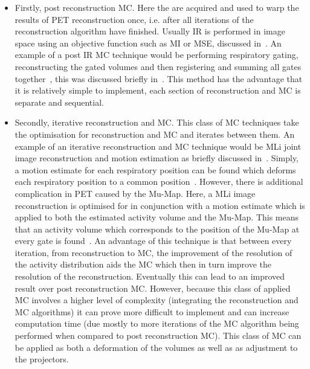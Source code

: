             \begin{itemize}
                \item Firstly, post reconstruction \gls{MC}. Here the  are acquired and used to warp the results of \gls{PET} reconstruction once, i.e. after all iterations of the reconstruction algorithm have finished. Usually \gls{IR} is performed in image space using an objective function such as \gls{MI} or \gls{MSE}, discussed in~. An example of a post \gls{IR} \gls{MC} technique would be performing respiratory gating, reconstructing the gated volumes and then registering and summing all gates together~\parencite{Polycarpou2012AnalysisImaging}, this was discussed briefly in~. This method has the advantage that it is relatively simple to implement, each section of reconstruction and \gls{MC} is separate and sequential.
                
                \item Secondly, iterative reconstruction and \gls{MC}. This class of \gls{MC} techniques take the optimisation for reconstruction and \gls{MC} and iterates between them. An example of an iterative reconstruction and \gls{MC} technique would be \gls{MLi} joint image reconstruction and motion estimation as briefly discussed in~. Simply, a motion estimate for each respiratory position can be found which deforms each respiratory position to a common position~\parencite{Manjeshwar2006, Qiao2006}. However, there is additional complication in \gls{PET} caused by the \gls{Mu-Map}. Here, a \gls{MLi} image reconstruction is optimised for in conjunction with a motion estimate which is applied to both the estimated activity volume and the \gls{Mu-Map}. This means that an activity volume which corresponds to the position of the \gls{Mu-Map} at every gate is found~\parencite{Bousse2016a, Bousse2016}. An advantage of this technique is that between every iteration, from reconstruction to \gls{MC}, the improvement of the resolution of the activity distribution aids the \gls{MC} which then in turn improve the resolution of the reconstruction. Eventually this can lead to an improved result over post reconstruction \gls{MC}. However, because this class of applied \gls{MC} involves a higher level of complexity (integrating the reconstruction and \gls{MC} algorithms) it can prove more difficult to implement and can increase computation time (due mostly to more iterations of the \gls{MC} algorithm being performed when compared to post reconstruction \gls{MC}). This class of \gls{MC} can be applied as both a deformation of the volumes as well as as adjustment to the projectors.
                

\end{itemize}
